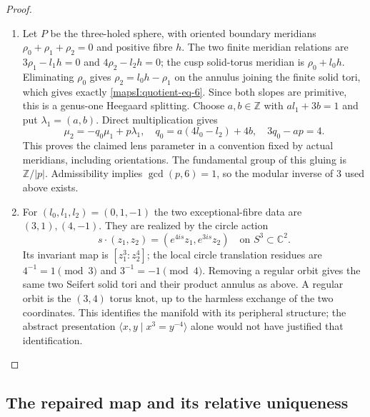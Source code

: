 \begin{proof}
\begin{enumerate}[label=\arabic*.,leftmargin=*]
\item Let $P$ be the three-holed sphere, with oriented boundary
meridians $\rho_0+\rho_1+\rho_2=0$ and positive fibre $h$.
The two finite meridian relations are
$3\rho_1-l_1h=0$ and $4\rho_2-l_2h=0$; the cusp solid-torus
meridian is $\rho_0+l_0h$.  Eliminating $\rho_0$ gives
$\rho_2=l_0h-\rho_1$ on the annulus joining the finite solid
tori, which gives exactly \eqref{mapsI:quotient-eq-6}.  Since both slopes are
primitive, this is a genus-one Heegaard splitting.  Choose
$a,b\in\mathbb Z$ with $al_1+3b=1$ and put
$\lambda_1=(a,b)$.  Direct multiplication gives
\[
 \mu_2=-q_0\mu_1+p\lambda_1,
 \quad q_0=a(4l_0-l_2)+4b,
 \quad 3q_0-ap=4.
 \label{mapsI:quotient-eq-7}
\]
This proves the claimed lens parameter in a convention fixed
by actual meridians, including orientations.  The fundamental
group of this gluing is $\mathbb Z/|p|$.  Admissibility implies
$\gcd(p,6)=1$, so the modular inverse of $3$ used above exists.

\item For $(l_0,l_1,l_2)=(0,1,-1)$ the two exceptional-fibre data
are $(3,1),(4,-1)$.  They are realized by the circle action
\[
 s\cdot(z_1,z_2)=(e^{4is}z_1,e^{3is}z_2)
 \quad\text{on } S^3\subset\mathbb C^2.
\]
Its invariant map is $[z_1^3:z_2^4]$; the local circle
translation residues are $4^{-1}=1\pmod3$ and
$3^{-1}=-1\pmod4$.  Removing a regular orbit gives the
same two Seifert solid tori and their product annulus as
above.  A regular orbit is the $(3,4)$ torus knot, up to
the harmless exchange of the two coordinates.  This
identifies the manifold with its peripheral structure;
the abstract presentation $\langle x,y\mid x^3=y^{-4}\rangle$
alone would not have justified that identification.
\end{enumerate}
\end{proof}

\subsection{The repaired map and its relative uniqueness}

